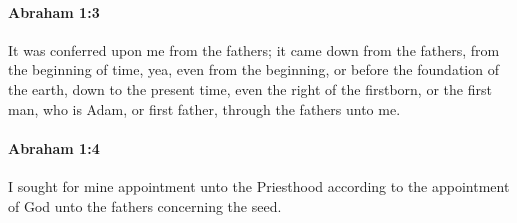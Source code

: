 
		\paragraph{Abraham 1:3} %
			\label{ABRAHAM-1-3}

			It was conferred upon me from the fathers; it came down from the fathers, from the beginning of time, yea, even from the beginning, or before the foundation of the earth, down to the present time, even the right of the firstborn, or the first man, who is Adam, or first father, through the fathers unto me.


		\paragraph{Abraham 1:4} %
			\label{ABRAHAM-1-4}

			I sought for mine appointment unto the Priesthood according to the appointment of God unto the fathers concerning the seed.

